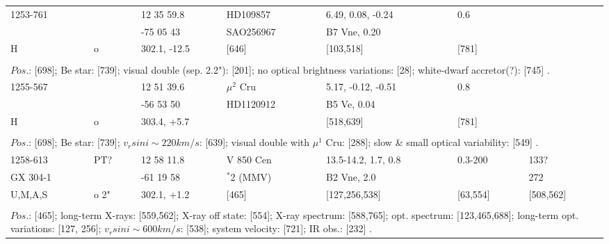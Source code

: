 \documentclass{aa}
\begin{document}
\begin{table*}[h]
\begin{tabular}{p{2.5cm}p{1cm}p{1.8cm}p{2.3cm}p{3.3cm}p{2.0cm}p{2.2cm}}
\noalign{\smallskip}
\hline
\noalign{\smallskip}
1253-761   &              & 12 35 59.8     & HD109857             & 6.49, 0.08, -0.24        &    0.6              &                   \\
                    &              & -75 05 43       &  SAO256967         &  B7 Vne, 0.20            &                       &                   \\
    H             & o          & 302.1, -12.5   &      [646]                &  [103,518]                   & [781]           &                  \\
\\
\multicolumn{7}{p{17.5cm}}{
$Pos$.: [698]; Be star: [739]; visual double (sep. 2.2"): [201]; no optical brightness variations: [28]; 
white-dwarf accretor(?): [745] .}\\

\noalign{\smallskip}
\hline
\noalign{\smallskip}
1255-567   &          & 12 51 39.6       & $\mu^2$ Cru      & 5.17, -0.12, -0.51       & 0.8           &                   \\
                    &          & -56 53 50         &  HD1120912       &  B5 Ve, 0.04              &                  &                   \\
    H             & o      & 303.4, +5.7       &                              &  [518,639]                 & [781]     &                   \\
\\
\multicolumn{7}{p{17.5cm}}{
$Pos$.: [698]; Be star: [739]; $v_rsin i \sim 220 km/s$: [639]; visual double with $\mu^1$ Cru: [288]; slow \& small
optical variability: [549] .}\\

\noalign{\smallskip}
\hline
\noalign{\smallskip}
1258-613     & PT?      & 12 58 11.8       & V 850 Cen       & 13.5-14.2, 1.7, 0.8      & 0.3-200      & 133?   \\
 GX 304-1    &               & -61 19 58         & $^*$2 (MMV)   &  B2 Vne, 2.0               &                     & 272          \\
U,M,A,S       & o 2"      & 302.1, +1.2       & [465]                 &  [127,256,538]            & [63,554]     & [508,562]  \\
\\
\multicolumn{7}{p{17.5cm}}{
$Pos$.: [465]; long-term X-rays: [559,562]; X-ray off state: [554]; X-ray spectrum: [588,765]; opt. spectrum: [123,465,688];
long-term opt. variations: [127, 256]; $v_rsin i \sim 600 km/s$: [538]; system velocity: [721]; IR obs.: [232] .}\\


\end{tabular}
\end{table*}
\end{document}
